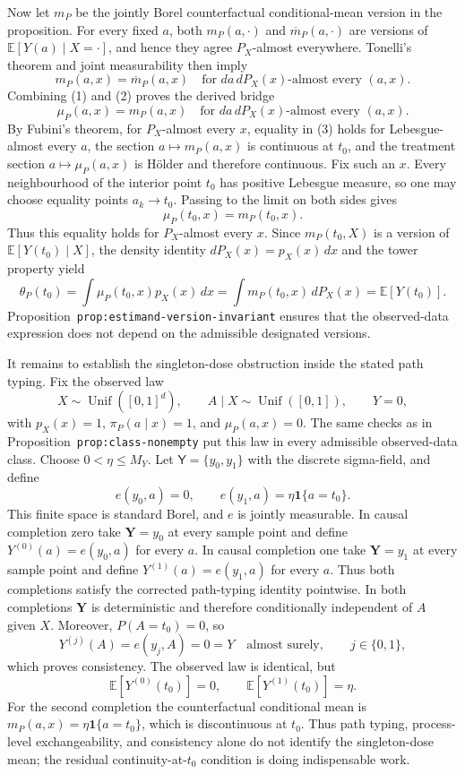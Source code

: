 Now let \(m_P\) be the jointly Borel counterfactual conditional-mean version in the proposition. For every fixed \(a\), both \(m_P(a,\cdot)\) and \(\overline m_P(a,\cdot)\) are versions of \(\mathbb E[Y(a)\mid X=\cdot]\), and hence they agree \(P_X\)-almost everywhere. Tonelli's theorem and joint measurability then imply
\[
m_P(a,x)=\overline m_P(a,x)
\quad\text{for }da\,dP_X(x)\text{-almost every }(a,x). \tag{2}
\]
Combining (1) and (2) proves the derived bridge
\[
\mu_P(a,x)=m_P(a,x)
\quad\text{for }da\,dP_X(x)\text{-almost every }(a,x). \tag{3}
\]
By Fubini's theorem, for \(P_X\)-almost every \(x\), equality in (3) holds for Lebesgue-almost every \(a\), the section \(a\mapsto m_P(a,x)\) is continuous at \(t_0\), and the treatment section \(a\mapsto\mu_P(a,x)\) is Hölder and therefore continuous. Fix such an \(x\). Every neighbourhood of the interior point \(t_0\) has positive Lebesgue measure, so one may choose equality points \(a_k\to t_0\). Passing to the limit on both sides gives
\[
\mu_P(t_0,x)=m_P(t_0,x).
\]
Thus this equality holds for \(P_X\)-almost every \(x\). Since \(m_P(t_0,X)\) is a version of \(\mathbb E[Y(t_0)\mid X]\), the density identity \(dP_X(x)=p_X(x)\,dx\) and the tower property yield
\[
\theta_P(t_0)
=\int\mu_P(t_0,x)p_X(x)\,dx
=\int m_P(t_0,x)\,dP_X(x)
=\mathbb E[Y(t_0)].
\]
Proposition~\texttt{prop:estimand-version-invariant} ensures that the observed-data expression does not depend on the admissible designated versions.

It remains to establish the singleton-dose obstruction inside the stated path typing. Fix the observed law
\[
X\sim\operatorname{Unif}([0,1]^d),\qquad
A\mid X\sim\operatorname{Unif}([0,1]),\qquad Y=0,
\]
with \(p_X(x)=1\), \(\pi_P(a\mid x)=1\), and \(\mu_P(a,x)=0\). The same checks as in Proposition~\texttt{prop:class-nonempty} put this law in every admissible observed-data class. Choose \(0<\eta\le M_Y\). Let \(\mathsf Y=\{y_0,y_1\}\) with the discrete sigma-field, and define
\[
e(y_0,a)=0,
\qquad
e(y_1,a)=\eta\mathbf 1\{a=t_0\}.
\]
This finite space is standard Borel, and \(e\) is jointly measurable. In causal completion zero take \(\mathbf Y=y_0\) at every sample point and define \(Y^{(0)}(a)=e(y_0,a)\) for every \(a\). In causal completion one take \(\mathbf Y=y_1\) at every sample point and define \(Y^{(1)}(a)=e(y_1,a)\) for every \(a\). Thus both completions satisfy the corrected path-typing identity pointwise. In both completions \(\mathbf Y\) is deterministic and therefore conditionally independent of \(A\) given \(X\). Moreover, \(P(A=t_0)=0\), so
\[
Y^{(j)}(A)=e(y_j,A)=0=Y
\quad\text{almost surely},\qquad j\in\{0,1\},
\]
which proves consistency. The observed law is identical, but
\[
\mathbb E[Y^{(0)}(t_0)]=0,
\qquad
\mathbb E[Y^{(1)}(t_0)]=\eta.
\]
For the second completion the counterfactual conditional mean is \(m_P(a,x)=\eta\mathbf 1\{a=t_0\}\), which is discontinuous at \(t_0\). Thus path typing, process-level exchangeability, and consistency alone do not identify the singleton-dose mean; the residual continuity-at-\(t_0\) condition is doing indispensable work.